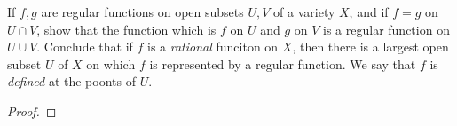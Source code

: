 \label{1.4.1}

If $f, g$ are regular functions on open subsets $U, V$ of a variety $X$, and if $f = g$ on $U \cap V$, show that the function which is $f$ on $U$ and $g$ on $V$ is a regular function on $U \cup V$. Conclude that if $f$ is a \emph{rational} funciton on $X$, then there is a largest open subset $U$ of $X$ on which $f$ is represented by a regular function. We say that $f$ is \emph{defined} at the poonts of $U$.

\begin{proof}

\end{proof}
